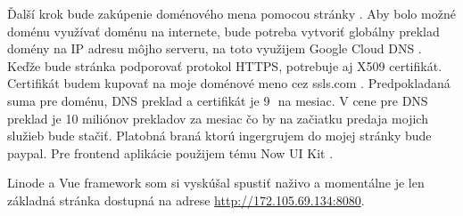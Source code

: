 Ďalší krok bude zakúpenie doménového mena pomocou stránky \cite{domain}. Aby bolo možné doménu využívať doménu na internete, bude potreba vytvoriť globálny preklad domény na IP adresu môjho serveru, na toto využijem Google Cloud DNS \cite{dns}. Keďže bude stránka podporovať protokol HTTPS, potrebuje aj X509 certifikát. Certifikát budem kupovať na moje doménové meno cez ssls.com \cite{cert}. Predpokladaná suma pre doménu, DNS preklad a certifikát je 9\,\texteuro~na mesiac. V cene pre DNS preklad je 10 miliónov prekladov za mesiac čo by na začiatku predaja mojich služieb bude stačiť. Platobná braná ktorú ingergrujem do mojej stránky bude paypal. Pre frontend aplikácie použijem tému Now UI Kit \cite{vue_kit}.

Linode a Vue framework som si vyskúšal spustiť naživo a momentálne je len základná stránka dostupná na adrese \url{http://172.105.69.134:8080}.